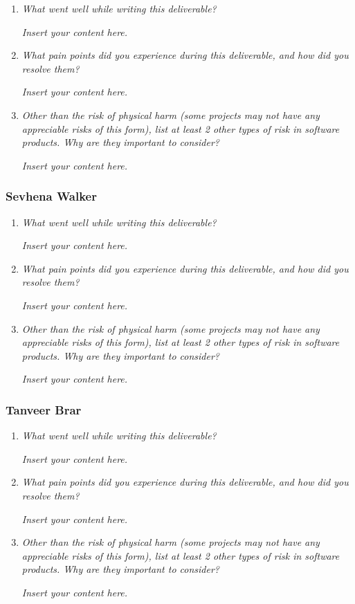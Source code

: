 \documentclass{article}
\newcommand{\lips}{\textit{Insert your content here.}}
\begin{document}
\begin{enumerate}
  \item \textit{What went well while writing this deliverable?}
  
  \lips

  \item \textit{What pain points did you experience during this deliverable, and how did you resolve them?}
  
  \lips
  
  \item[4.] \textit{Other than the risk of physical harm (some projects may not have any appreciable risks of this form),
  list at least 2 other types of risk in software products. Why are they important to consider?}

  \lips

\end{enumerate}

\subsubsection*{Sevhena Walker}

\begin{enumerate}
  \item \textit{What went well while writing this deliverable?}
  
  \lips

  \item \textit{What pain points did you experience during this deliverable, and how did you resolve them?}
  
  \lips
  
  \item[4.] \textit{Other than the risk of physical harm (some projects may not have any appreciable risks of this form),
  list at least 2 other types of risk in software products. Why are they important to consider?}

  \lips

\end{enumerate}

\subsubsection*{Tanveer Brar}

\begin{enumerate}
  \item \textit{What went well while writing this deliverable?}
  
  \lips

  \item \textit{What pain points did you experience during this deliverable, and how did you resolve them?}
  
  \lips
  
  \item[4.] \textit{Other than the risk of physical harm (some projects may not have any appreciable risks of this form),
  list at least 2 other types of risk in software products. Why are they important to consider?}

  \lips

\end{enumerate}
\end{document}
